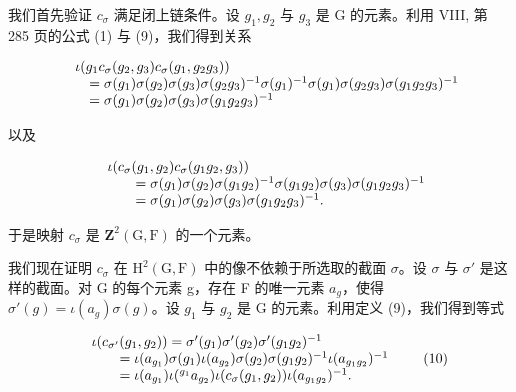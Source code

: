 我们首先验证 \(c_{\sigma}\) 满足闭上链条件。设 \(g_{1}, g_{2}\) 与 \(g_{3}\) 是 G 的元素。利用 VIII, 第 285 页的公式 (1) 与 (9)，我们得到关系

\[
\begin{array}{r l} & {\iota (g _ {1} c _ {\sigma} (g _ {2}, g _ {3}) c _ {\sigma} (g _ {1}, g _ {2} g _ {3}))} \\ & {\quad = \sigma (g _ {1}) \sigma (g _ {2}) \sigma (g _ {3}) \sigma (g _ {2} g _ {3}) ^ {- 1} \sigma (g _ {1}) ^ {- 1} \sigma (g _ {1}) \sigma (g _ {2} g _ {3}) \sigma (g _ {1} g _ {2} g _ {3}) ^ {- 1}} \\ & {\quad = \sigma (g _ {1}) \sigma (g _ {2}) \sigma (g _ {3}) \sigma (g _ {1} g _ {2} g _ {3}) ^ {- 1}} \end{array}
\]

以及

\[
\begin{array}{r l} & {\iota (c _ {\sigma} (g _ {1}, g _ {2}) c _ {\sigma} (g _ {1} g _ {2}, g _ {3}))} \\ & {\qquad = \sigma (g _ {1}) \sigma (g _ {2}) \sigma (g _ {1} g _ {2}) ^ {- 1} \sigma (g _ {1} g _ {2}) \sigma (g _ {3}) \sigma (g _ {1} g _ {2} g _ {3}) ^ {- 1}} \\ & {\qquad = \sigma (g _ {1}) \sigma (g _ {2}) \sigma (g _ {3}) \sigma (g _ {1} g _ {2} g _ {3}) ^ {- 1}.} \end{array}
\]

于是映射 \(c_{\sigma}\) 是 \(\mathbf{Z}^2 (\mathrm{G},\mathrm{F})\) 的一个元素。

我们现在证明 \(c_{\sigma}\) 在 \(\mathrm{H}^{2}(\mathrm{G},\mathrm{F})\) 中的像不依赖于所选取的截面 \(\sigma\)。设 \(\sigma\) 与 \(\sigma'\) 是这样的截面。对 G 的每个元素 g，存在 F 的唯一元素 \(a_{g}\)，使得 \(\sigma'(g) = \iota(a_{g})\sigma(g)\)。设 \(g_{1}\) 与 \(g_{2}\) 是 G 的元素。利用定义 (9)，我们得到等式

\[
\begin{array}{r l} & {\iota (c _ {\sigma^ {\prime}} (g _ {1}, g _ {2})) = \sigma^ {\prime} (g _ {1}) \sigma^ {\prime} (g _ {2}) \sigma^ {\prime} (g _ {1} g _ {2}) ^ {- 1}} \\ & {\qquad = \iota (a _ {g _ {1}}) \sigma (g _ {1}) \iota (a _ {g _ {2}}) \sigma (g _ {2}) \sigma (g _ {1} g _ {2}) ^ {- 1} \iota (a _ {g _ {1} g _ {2}}) ^ {- 1}} \\ & {\qquad = \iota (a _ {g _ {1}}) \iota (^ {g _ {1}} a _ {g _ {2}}) \iota (c _ {\sigma} (g _ {1}, g _ {2})) \iota (a _ {g _ {1} g _ {2}}) ^ {- 1}.} \end{array}\tag{10}
\]

